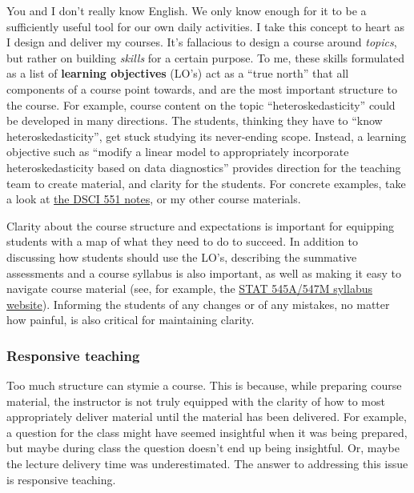 \documentclass[]{article}
\begin{document}
You and I don't really know English. We only know enough for it to be a sufficiently useful tool for our own daily activities. I take this concept to heart as I design and deliver my courses. It's fallacious to design a course around \emph{topics}, but rather on building \emph{skills} for a certain purpose. To me, these skills formulated as a list of \textbf{learning objectives} (LO's) act as a ``true north'' that all components of a course point towards, and are the most important structure to the course. For example, course content on the topic ``heteroskedasticity'' could be developed in many directions. The students, thinking they have to ``know heteroskedasticity'', get stuck studying its never-ending scope. Instead, a learning objective such as ``modify a linear model to appropriately incorporate heteroskedasticity based on data diagnostics'' provides direction for the teaching team to create material, and clarity for the students. For concrete examples, take a look at \href{https://ubc-mds.github.io/DSCI_551_stat-prob-dsci/lectures/}{the DSCI 551 notes}, or my other course materials.

Clarity about the course structure and expectations is important for equipping students with a map of what they need to do to succeed. In addition to discussing how students should use the LO's, describing the summative assessments and a course syllabus is also important, as well as making it easy to navigate course material (see, for example, the \href{https://stat545.stat.ubc.ca/}{STAT 545A/547M syllabus website}). Informing the students of any changes or of any mistakes, no matter how painful, is also critical for maintaining clarity.

\hypertarget{responsive-teaching}{%
\subsubsection{Responsive teaching}\label{responsive-teaching}}

Too much structure can stymie a course. This is because, while preparing course material, the instructor is not truly equipped with the clarity of how to most appropriately deliver material until the material has been delivered. For example, a question for the class might have seemed insightful when it was being prepared, but maybe during class the question doesn't end up being insightful. Or, maybe the lecture delivery time was underestimated. The answer to addressing this issue is responsive teaching.
\end{document}
